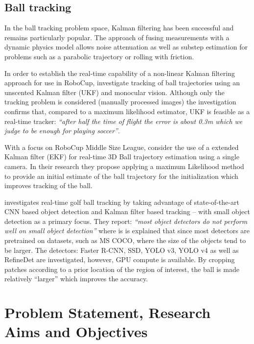 \documentclass[a4paper,twoside,12pt]{report}
\begin{document}
\section{Ball tracking}

In the ball tracking problem space, Kalman filtering has been successful and remains particularly popular. The approach of fusing measurements with a dynamic physics model allows noise attenuation as well as substep estimation for problems such as a parabolic trajectory or rolling with friction.

In order to establish the real-time capability of a non-linear Kalman filtering approach for use in RoboCup, \cite{robocuptrack} investigate tracking of ball trajectories using an unscented Kalman filter (UKF) and monocular vision. Although only the tracking problem is considered (manually processed images) the investigation confirms that, compared to a maximum likelihood estimator, UKF is feasible as a real-time tracker: \textit{``after half the time of flight the error is about 0.3m which we judge to be enough for playing soccer''}.

With a focus on RoboCup Middle Size League, \cite{3dparabola} consider the use of a extended Kalman filter (EKF) for real-time 3D Ball trajectory estimation using a single camera. In their research they propose applying a maximum Likelihood method to provide an initial estimate of the ball trajectory for the initialization which improves tracking of the ball.

\cite{golftrack} investigates real-time golf ball tracking by taking advantage of state-of-the-art CNN based object detection and Kalman filter based tracking -- with small object detection as a primary focus. They report: \textit{``most object detectors do not perform well on small object detection''} where is is explained that since most detectors are pretrained on datasets, such as MS COCO, where the size of the objects tend to be larger. The detectors: Faster R-CNN, SSD, YOLO v3, YOLO v4 as well as RefineDet are investigated, however, GPU compute is available. By cropping patches according to a prior location of the region of interest, the ball is made relatively “larger” which improves the accuracy.  

\chapter{Problem Statement, Research Aims and Objectives}
\end{document}
